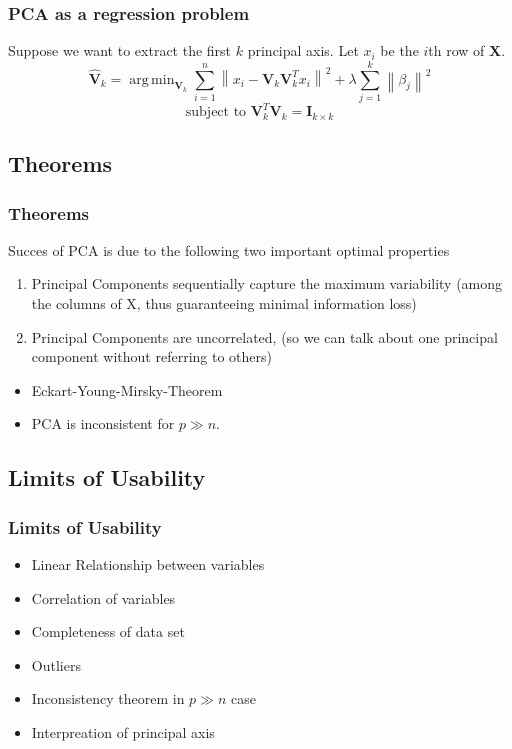 \documentclass{beamer}
\theoremstyle{plain}
\theoremstyle{definition}
\newcommand{\mat}[1]{\mathbf{#1}}
\DeclareMathOperator*{\argmin}{arg\,min}
\newcommand{\norm}[1]{\left\lVert #1 \right\rVert}
\begin{document}
\begin{frame}
\frametitle{PCA as a regression problem}
Suppose we want to extract the first $k$ principal axis. Let $x_i$ be the $i$th row of $\mat X$.
$$\mat{\hat{V}}_k = \argmin_{\mat{V}_k} \sum_{i=1}^{n} \norm{x_i - \mat{V}_k \mat{V}_k^Tx_i}^2 + \lambda \sum_{j=1}^{k}\norm{\beta_j}^2$$
$$\text{subject to }\mat{V}_k^T\mat{V}_k = \mat{I}_{k \times k}$$

\end{frame}
\subsection{Theorems}

\begin{frame}
\frametitle{Theorems}
Succes of PCA is due to the following two important optimal properties
\begin{enumerate}
\item Principal Components sequentially capture the maximum variability (among the columns of X, thus guaranteeing minimal information loss)
\item Principal Components are uncorrelated, (so we can talk about one principal component without referring to others)
\end{enumerate}

\begin{itemize}
\item Eckart-Young-Mirsky-Theorem
\item PCA is inconsistent for $p \gg n$.
\end{itemize}
\end{frame}

\subsection{Limits of Usability}
\begin{frame}
\frametitle{Limits of Usability}
\begin{itemize}
\item Linear Relationship between variables
\item Correlation of variables
\item Completeness of data set
\item Outliers
\item Inconsistency theorem in $p \gg n$ case
\item Interpreation of principal axis
\end{itemize}


\end{frame}
\end{document}
